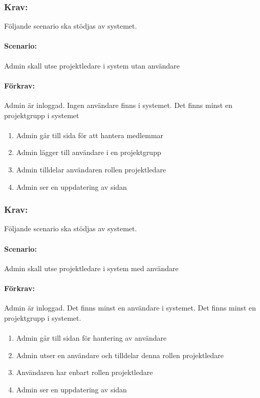 \documentclass[paper=a4, fontsize=11pt,twoside]{article}
\begin{document}
	\subsubsection*{Krav:} Följande scenario ska stödjas av systemet. 
	\paragraph{Scenario:}
	Admin skall utse projektledare i system utan användare
	\paragraph{Förkrav:}
	Admin är inloggad. Ingen användare finns i systemet. Det finns minst en projektgrupp i systemet
	\paragraph{}
	\begin{enumerate}
		\item Admin går till sida för att hantera medlemmar
		\item Admin lägger till användare i en projektgrupp
		\item Admin tilldelar användaren rollen projektledare
		\item Admin ser en uppdatering av sidan
	\end{enumerate}
	
	\subsubsection*{Krav:} Följande scenario ska stödjas av systemet. 
	\paragraph{Scenario:}
	Admin skall utse projektledare i system med användare
	\paragraph{Förkrav:}
	Admin är inloggad. Det finns minst en användare i systemet. Det finns minst en projektgrupp i systemet.
	\paragraph{}
	\begin{enumerate}
		\item Admin går till sidan för hantering av användare
		\item Admin utser en användare och tilldelar denna rollen projektledare
		\item Användaren har enbart rollen projektledare
		\item Admin ser en uppdatering av sidan
	\end{enumerate}
	
\end{document}
